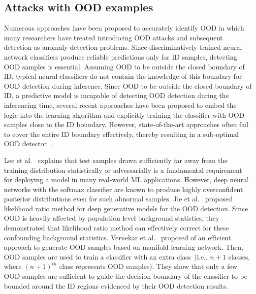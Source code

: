 \subsection{Attacks with OOD examples}
Numerous approaches have been proposed to accurately identify OOD in which many researchers have treated introducing OOD attacks and subsequent detection as anomaly detection problems. Since discriminatively trained neural network classifiers produce reliable predictions only for ID samples, detecting OOD samples is essential. Assuming OOD to be outside the closed boundary of ID, typical neural classifiers do not contain the knowledge of this boundary for OOD detection during inference. Since OOD to be outside the closed boundary of ID, a predictive model is incapable of detecting OOD detection during the inferencing time, several recent approaches have been proposed to embed the logic into the learning algorithm and explicitly training the classifier with OOD samples close to the ID boundary. However, state-of-the-art approaches often fail to cover the entire ID boundary effectively, thereby resulting in a sub-optimal OOD detector~\cite{OOD10,OOD12}. 

\hspace*{3.5mm} Lee et al.~\cite{OOD13} explains that test samples drawn sufficiently far away from the training distribution statistically or adversarially is a fundamental requirement for deploying a model in many real-world ML applications. However, deep neural networks with the softmax classifier are known to produce highly overconfident posterior distributions even for such abnormal samples.  %
Jie et al.~\cite{OOD1} proposed likelihood ratio method for deep generative models for the OOD detection. Since OOD is heavily affected by population level background statistics, they demonstrated that likelihood ratio method can effectively correct for these confounding background statistics. Vernekar et al.~\cite{OOD2} proposed of an efficient approach to generate OOD samples based on manifold learning network. Then, OOD samples are used to train a classifier with an extra class~(i.e., $n+1$ classes, where ${(n+1)}^{th}$ class represents OOD samples). %
They show that only a few OOD samples are sufficient to guide the decision boundary of the classifier to be bounded around the ID regions evidenced by their OOD detection results.

